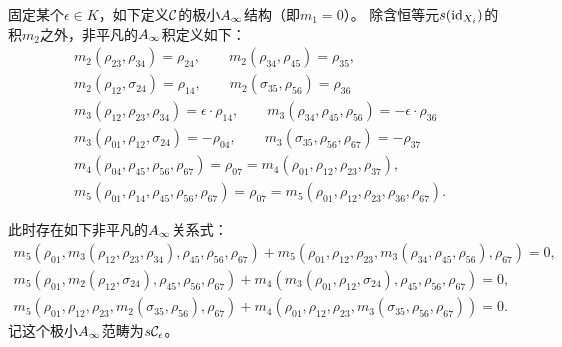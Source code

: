 \begin{example}
  固定某个$\epsilon\in K$，如下定义$\mathcal{C}$的极小$A_{\infty}$结构（即$m_1=0$）。
  除含恒等元$s(\mathrm{id}_{X_i})$的积$m_2$之外，非平凡的$A_{\infty}$积定义如下：
  \[
  \begin{gathered}
    m_2(\rho_{23},\rho_{34})=\rho_{24},\qquad
    m_2(\rho_{34},\rho_{45})=\rho_{35},\\
    m_2(\rho_{12},\sigma_{24})=\rho_{14},\qquad
    m_2(\sigma_{35},\rho_{56})=\rho_{36}\\
    m_3(\rho_{12},\rho_{23},\rho_{34})=\epsilon\cdot\rho_{14},\qquad
    m_3(\rho_{34},\rho_{45},\rho_{56})=-\epsilon\cdot\rho_{36}\\
    m_3(\rho_{01},\rho_{12},\sigma_{24})=-\rho_{04},\qquad
    m_3(\sigma_{35},\rho_{56},\rho_{67})=-\rho_{37}\\
    m_4(\rho_{04},\rho_{45},\rho_{56},\rho_{67})=\rho_{07}
    =m_4(\rho_{01},\rho_{12},\rho_{23},\rho_{37}),\\
    m_5(\rho_{01},\rho_{14},\rho_{45},\rho_{56},\rho_{67})=\rho_{07}
    =m_5(\rho_{01},\rho_{12},\rho_{23},\rho_{36},\rho_{67}).
  \end{gathered}
  \]

  此时存在如下非平凡的$A_{\infty}$关系式：
  \[
  \begin{gathered}
    m_5(\rho_{01},m_3(\rho_{12},\rho_{23},\rho_{34}),\rho_{45},\rho_{56},\rho_{67})
    +m_5(\rho_{01},\rho_{12},\rho_{23},m_3(\rho_{34},\rho_{45},\rho_{56}),\rho_{67})=0,\\
    m_5(\rho_{01},m_2(\rho_{12},\sigma_{24}),\rho_{45},\rho_{56},\rho_{67})
    +m_4(m_3(\rho_{01},\rho_{12},\sigma_{24}),\rho_{45},\rho_{56},\rho_{67})=0,\\
    m_5(\rho_{01},\rho_{12},\rho_{23},m_2(\sigma_{35},\rho_{56}),\rho_{67})
    +m_4(\rho_{01},\rho_{12},\rho_{23},m_3(\sigma_{35},\rho_{56},\rho_{67}))=0.
  \end{gathered}
  \]
  记这个极小$A_{\infty}$范畴为$s\mathcal{C}_\epsilon$。
  \label{exa:c05-6.1}
\end{example}



